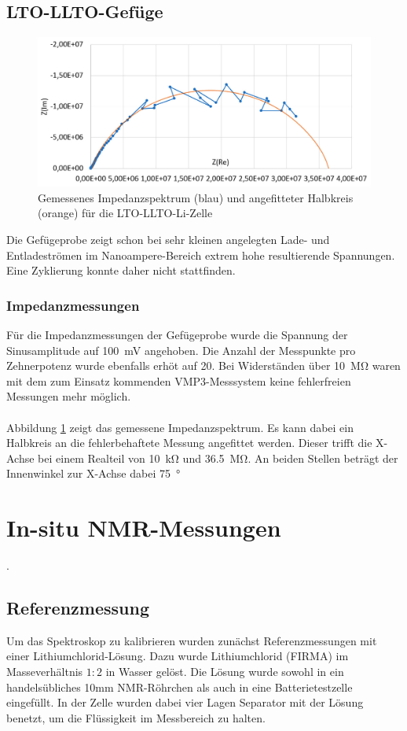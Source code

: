\documentclass[a4paper, 11pt, headsepline,footsepline,twoside,abstract]{scrbook}
\begin{document}
\subsection{LTO-LLTO-Gefüge}
\begin{figure}
	\centering
	\includegraphics[width=1.00\columnwidth]{images/IS_Gefuege.jpg}
	\caption{Gemessenes Impedanzspektrum (blau) und angefitteter Halbkreis (orange) für die LTO-LLTO-Li-Zelle}
	\label{is_Gefuege}
\end{figure}
Die Gefügeprobe zeigt schon bei sehr kleinen angelegten Lade- und Entladeströmen im Nanoampere-Bereich extrem hohe resultierende Spannungen. Eine Zyklierung konnte daher nicht stattfinden.
\subsubsection{Impedanzmessungen}
Für die Impedanzmessungen der Gefügeprobe wurde die Spannung der Sinusamplitude auf \SI{100}{\milli\volt} angehoben. Die Anzahl der Messpunkte pro Zehnerpotenz wurde ebenfalls erhöt auf 20. Bei Widerständen über \SI{10}{\mega\ohm} waren mit dem zum Einsatz kommenden VMP3-Messsystem keine fehlerfreien Messungen mehr möglich.
\\\\
Abbildung \ref{is_Gefuege} zeigt das gemessene Impedanzspektrum. Es kann dabei ein Halbkreis an die fehlerbehaftete Messung angefittet werden. Dieser trifft die X-Achse bei einem Realteil von \SI{10}{\kilo\ohm} und \SI{36.5}{\mega\ohm}. An beiden Stellen beträgt der Innenwinkel zur X-Achse dabei \SI{75}{\degree}
\newpage
\section{In-situ NMR-Messungen}
.
\subsection{Referenzmessung}
Um das Spektroskop zu kalibrieren wurden zunächst Referenzmessungen mit einer Lithium\-chlorid-Lösung. Dazu wurde Lithiumchlorid (FIRMA) im Masseverhältnis $1:2$ in Wasser gelöst. Die Lösung wurde sowohl in ein handelsübliches 10mm NMR-Röhrchen als auch in eine Batterietestzelle eingefüllt. In der Zelle wurden dabei vier Lagen Separator mit der Lösung benetzt, um die Flüssigkeit im Messbereich zu halten.
\end{document}
